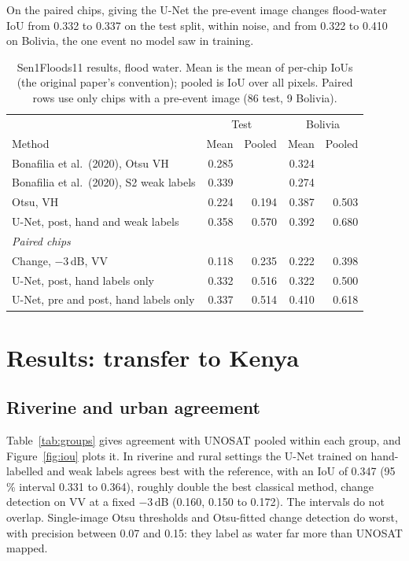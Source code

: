 \documentclass[11pt]{article}
\begin{document}
On the paired chips, giving the U-Net the pre-event image changes flood-water
IoU from 0.332 to 0.337 on the test split, within noise, and from 0.322 to
0.410 on Bolivia, the one event no model saw in training.

\begin{table}[h]
\centering
\small
\caption{Sen1Floods11 results, flood water. Mean is the mean of per-chip IoUs
(the original paper's convention); pooled is IoU over all pixels. Paired rows
use only chips with a pre-event image (86 test, 9 Bolivia).}
\label{tab:s1f}
\begin{tabular}{lrrrr}
\toprule
& \multicolumn{2}{c}{Test} & \multicolumn{2}{c}{Bolivia} \\
Method & Mean & Pooled & Mean & Pooled \\
\midrule
Bonafilia et al.\ (2020), Otsu VH & 0.285 & & 0.324 & \\
Bonafilia et al.\ (2020), S2 weak labels & 0.339 & & 0.274 & \\
\midrule
Otsu, VH & 0.224 & 0.194 & 0.387 & 0.503 \\
U-Net, post, hand and weak labels & 0.358 & 0.570 & 0.392 & 0.680 \\
\midrule
\multicolumn{5}{l}{\textit{Paired chips}} \\
Change, $-3$\,dB, VV & 0.118 & 0.235 & 0.222 & 0.398 \\
U-Net, post, hand labels only & 0.332 & 0.516 & 0.322 & 0.500 \\
U-Net, pre and post, hand labels only & 0.337 & 0.514 & 0.410 & 0.618 \\
\bottomrule
\end{tabular}
\end{table}

\section{Results: transfer to Kenya}
\label{sec:kenya}

\subsection{Riverine and urban agreement}

Table~\ref{tab:groups} gives agreement with UNOSAT pooled within each group,
and Figure~\ref{fig:iou} plots it. In riverine and rural settings the U-Net
trained on hand-labelled and weak labels agrees best with the reference, with
an IoU of 0.347 (95\,\% interval 0.331 to 0.364), roughly double the best
classical method, change detection on VV at a fixed $-3$\,dB (0.160, 0.150
to 0.172). The intervals do not overlap. Single-image Otsu thresholds and
Otsu-fitted change detection do worst, with precision between 0.07 and 0.15:
they label as water far more than UNOSAT mapped.
\end{document}
